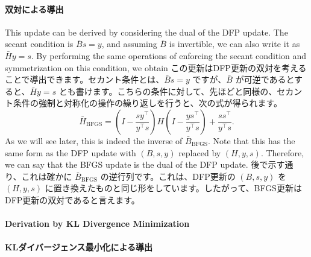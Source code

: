 \documentclass[0_main]{subfiles}
\begin{document}
    \paragraph{双対による導出}
\fi

\ifEn
    This update can be derived by considering the dual of the DFP update. The secant condition is $\bar{B} s = y$, and assuming $\bar{B}$ is invertible, we can also write it as $\bar{H} y = s$. By performing the same operations of enforcing the secant condition and symmetrization on this condition, we obtain
\else
    この更新はDFP更新の双対を考えることで導出できます。セカント条件とは、$\bar{B} s = y$ ですが、$\bar{B}$ が可逆であるとすると、$\bar{H} y = s$ とも書けます。こちらの条件に対して、先ほどと同様の、セカント条件の強制と対称化の操作の繰り返しを行うと、次の式が得られます。
\fi
\begin{equation*}
    \bar{H}_{\mathrm{BFGS}} = \left(I - \frac{s y^\top}{y^\top s}\right) H \left(I - \frac{y s^\top}{y^\top s}\right) + \frac{s s^\top}{y^\top s}.
\end{equation*}
\ifEn
    As we will see later, this is indeed the inverse of $\bar{B}_{\mathrm{BFGS}}$. Note that this has the same form as the DFP update with $(B,s,y)$ replaced by $(H,y,s)$. Therefore, we can say that the BFGS update is the dual of the DFP update.
\else
    後で示す通り、これは確かに $\bar{B}_{\mathrm{BFGS}}$ の逆行列です。これは、DFP更新の $(B,s,y)$ を $(H,y,s)$ に置き換えたものと同じ形をしています。したがって、BFGS更新はDFP更新の双対であると言えます。
\fi


\ifEn
    \paragraph{Derivation by KL Divergence Minimization}
\else
    \paragraph{KLダイバージェンス最小化による導出}
\fi
\end{document}
